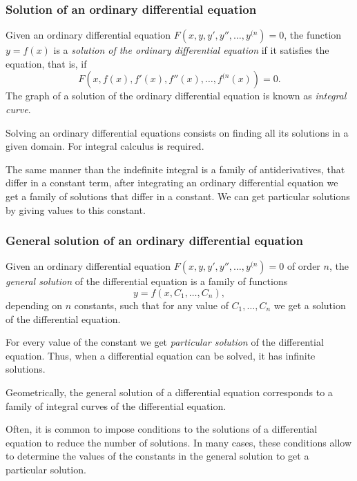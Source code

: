 \begin{frame}
\frametitle{Solution of an ordinary differential equation}
\begin{definition}
Given an ordinary differential equation $F(x,y,y',y'',\ldots,y^{(n})=0$, the function $y=f(x)$ is a \emph{solution of the ordinary differential equation} if it satisfies the equation, that is, if
\[
F(x,f(x), f'(x), f''(x),\ldots, f^{(n}(x))=0.
\]
The graph of a solution of the ordinary differential equation is known as \emph{integral curve}.
\end{definition}

Solving an ordinary differential equations consists on finding all its solutions in a given domain. 
For integral calculus is required. 

The same manner than the indefinite integral is a family of antiderivatives, that differ in a constant term, after integrating an ordinary differential equation we get a family of solutions that differ in a constant.
We can get particular solutions by giving values to this constant.
\end{frame}


\begin{frame}
\frametitle{General solution of an ordinary differential equation}
\begin{definition}
Given an ordinary differential equation $F(x,y,y',y'',\ldots,y^{(n})=0$ of order $n$, the \emph{general solution} of the differential equation is a family of functions 
\[y =f (x,C_1,\ldots,C_n),\] 
depending on $n$ constants, such that for any value of $C_1,\ldots,C_n$ we get a solution of the differential equation. 
\end{definition}

For every value of the constant we get \emph{particular solution} of the differential equation.
Thus, when a differential equation can be solved, it has infinite solutions.

Geometrically, the general solution of a differential equation corresponds to a family of integral curves of the differential equation.

Often, it is common to impose conditions to the solutions of a differential equation to reduce the number of solutions. 
In many cases, these conditions allow to determine the values of the constants in the general solution to get a particular solution.
\end{frame}


